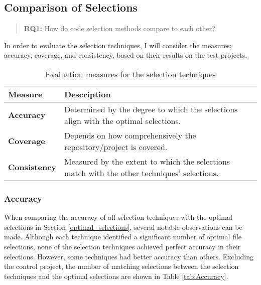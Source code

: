\subsection{Comparison of Selections} \label{Selections_compared}
\begin{quote}
    \textbf{RQ1:} How do code selection methods compare to each other?
\end{quote}

In order to evaluate the selection techniques, I will consider the measures; accuracy, coverage, and consistency, based on their results on the test projects. \\

\begin{table}[H]
  \centering
  \begin{tabularx}{\textwidth}{>{\hsize=0.5\hsize}X >{\hsize=1.5\hsize}X}
    \textbf{Measure} & \textbf{Description} \\ [1ex] \hline 
    
    \textbf{Accuracy} & Determined by the degree to which the selections align with the optimal selections. \\ [1ex]
    
    \textbf{Coverage} & Depends on how comprehensively the repository/project is covered. \\ [1ex] 
    
    \textbf{Consistency} & Measured by the extent to which the selections match with the other techniques' selections. \\ \hline
  \end{tabularx}
  \caption{Evaluation measures for the selection techniques}
  \label{tab:Evaluation_Measures}
\end{table}


\subsubsection{Accuracy}
When comparing the accuracy of all selection techniques with the optimal selections in Section \ref{optimal_selections}, several notable observations can be made. Although each technique identified a significant number of optimal file selections, none of the selection techniques achieved perfect accuracy in their selections. However, some techniques had better accuracy than others. Excluding the control project, the number of matching selections between the selection techniques and the optimal selections are shown in Table \ref{tab:Accuracy}.

